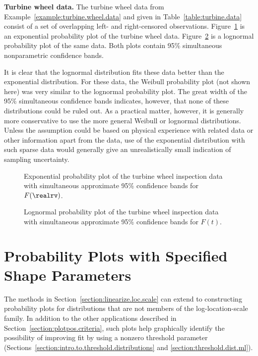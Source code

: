 \begin{example}
{\bf Turbine wheel data.} The turbine wheel data from
Example~\ref{example:turbine.wheel.data} and given in
Table~\ref{table:turbine.data} consist of a set of overlapping left-
and right-censored observations.
Figure~\ref{figure:turbine.npp.exp.ps} is an exponential probability
plot of the turbine wheel data.
Figure~\ref{figure:turbine.npp.lnor.ps} is a lognormal probability
plot of the same data. Both plots contain 95\% simultaneous
nonparametric confidence bands.

It is clear that the lognormal distribution fits these data better
than the exponential distribution.  For these data, the Weibull
probability plot (not shown here) was very similar to the lognormal
probability plot.  The great width of the 95\% simultaneous
confidence bands indicates, however, that none of these distributions
could be ruled out. As a practical matter, however, it is generally
more conservative to use the more general Weibull or lognormal
distributions. Unless the assumption could be based on physical
experience with related data or other information apart from the
data, use of the exponential distribution with such sparse data
would generally give an unrealistically small indication of
sampling uncertainty.
\begin{figure}
\caption{Exponential probability plot of the turbine wheel
inspection data with 
simultaneous approximate 95\% confidence bands for $F(\realrv)$.}
\label{figure:turbine.npp.exp.ps}
\end{figure}
\begin{figure}
\caption{Lognormal probability plot of the turbine wheel
inspection data with 
simultaneous approximate 95\% confidence bands for $F(t)$.}
\label{figure:turbine.npp.lnor.ps}
\end{figure}
\end{example}


\section{Probability Plots with Specified Shape Parameters}
\label{section:probplot.extensions} 
The methods in Section~\ref{section:linearize.loc.scale} can
extend to constructing probability plots for distributions that are not
members of the log-location-scale family. In addition to the other
applications described in Section~\ref{section:plotpos.criteria}, such
plots help graphically identify the possibility of improving fit by
using a nonzero threshold
parameter (Sections~\ref{section:intro.to.threshold.distributions} and
\ref{section:threshold.dist.ml}).

